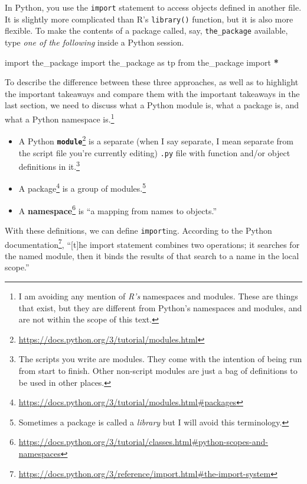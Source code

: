 \documentclass[
  12pt,
]{krantz}
\makeatletter
\newenvironment{Shaded}{\begin{snugshade}}{\end{snugshade}}
\newcommand{\ImportTok}[1]{#1}
\newcommand{\NormalTok}[1]{#1}
\newcommand{\OperatorTok}[1]{\textcolor[rgb]{0.43,0.43,0.43}{\textbf{#1}}}
\renewcommand{\href}[2]{#2\footnote{\url{#1}}}
\newenvironment{kframe}{%
\medskip{}
\setlength{\fboxsep}{.8em}
 \def\at@end@of@kframe{}%
 \ifinner\ifhmode%
  \def\at@end@of@kframe{\end{minipage}}%
  \begin{minipage}{\columnwidth}%
 \fi\fi%
 \def\FrameCommand##1{\hskip\@totalleftmargin \hskip-\fboxsep
 \colorbox{shadecolor}{##1}\hskip-\fboxsep
     \hskip-\linewidth \hskip-\@totalleftmargin \hskip\columnwidth}%
 \MakeFramed {\advance\hsize-\width
   \@totalleftmargin\z@ \linewidth\hsize
   \@setminipage}}%
 {\par\unskip\endMakeFramed%
 \at@end@of@kframe}
\renewenvironment{Shaded}{\begin{kframe}}{\end{kframe}}
\makeatother
\begin{document}
In Python, you use the \texttt{import} statement to access objects defined in another file. It is slightly more complicated than R's \texttt{library()} function, but it is also more flexible. To make the contents of a package called, say, \texttt{the\_package} available, type \emph{one of the following} inside a Python session.

\begin{Shaded}
\begin{Highlighting}[]
\ImportTok{import}\NormalTok{ the\_package}
\ImportTok{import}\NormalTok{ the\_package }\ImportTok{as}\NormalTok{ tp }
\ImportTok{from}\NormalTok{ the\_package }\ImportTok{import} \OperatorTok{*}
\end{Highlighting}
\end{Shaded}

To describe the difference between these three approaches, as well as to highlight the important takeaways and compare them with the important takeaways in the last section, we need to discuss what a Python module is, what a package is, and what a Python namespace is.\footnote{I am avoiding any mention of \emph{R's} namespaces and modules. These are things that exist, but they are different from Python's namespaces and modules, and are not within the scope of this text.}

\begin{itemize}
\item
  A Python \href{https://docs.python.org/3/tutorial/modules.html}{\textbf{\texttt{module}}} is a separate (when I say separate, I mean separate from the script file you're currently editing) \texttt{.py} file with function and/or object definitions in it.\footnote{The scripts you write are modules. They come with the intention of being run from start to finish. Other non-script modules are just a bag of definitions to be used in other places.}
\item
  A \href{https://docs.python.org/3/tutorial/modules.html\#packages}{package} is a group of modules.\footnote{Sometimes a package is called a \emph{library} but I will avoid this terminology.}
\item
  A \href{https://docs.python.org/3/tutorial/classes.html\#python-scopes-and-namespaces}{\textbf{namespace}} is ``a mapping from names to objects.''
\end{itemize}

With these definitions, we can define \texttt{import}ing. According to the \href{https://docs.python.org/3/reference/import.html\#the-import-system}{Python documentation}, ``{[}t{]}he import statement combines two operations; it searches for the named module, then it binds the results of that search to a name in the local scope.''
\end{document}
